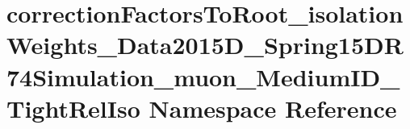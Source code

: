 \hypertarget{namespacecorrectionFactorsToRoot__isolationWeights__Data2015D__Spring15DR74Simulation__muon__MediumID__TightRelIso}{
\section{correctionFactorsToRoot\_\-isolationWeights\_\-Data2015D\_\-Spring15DR74Simulation\_\-muon\_\-MediumID\_\-TightRelIso Namespace Reference}
\label{namespacecorrectionFactorsToRoot__isolationWeights__Data2015D__Spring15DR74Simulation__muon__MediumID__TightRelIso}
}
